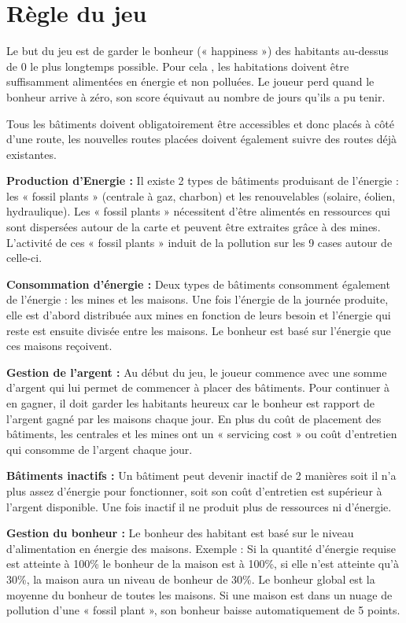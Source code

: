 \newpage
\section{Règle du jeu}

Le but du jeu est de garder le bonheur (« happiness ») des habitants au-dessus de 0 le plus longtemps possible. Pour cela , les habitations doivent être suffisamment alimentées en énergie et non polluées. Le joueur perd quand le bonheur arrive à zéro, son score équivaut au nombre de jours qu’ils a pu tenir.

Tous les bâtiments doivent obligatoirement être accessibles et donc placés à côté d’une route, les nouvelles routes placées doivent également suivre des routes déjà existantes.

\textbf{Production d’Energie :} 
	Il existe 2 types de bâtiments produisant de l’énergie : les « fossil plants » (centrale à gaz, charbon) et les renouvelables (solaire, éolien, hydraulique). Les « fossil plants » nécessitent d’être alimentés en ressources qui sont dispersées autour de la carte et peuvent être extraites grâce à des mines. L’activité de ces « fossil plants » induit de la pollution sur les 9 cases autour de celle-ci.
	
\textbf{Consommation d’énergie :}
	Deux types de bâtiments consomment également de l’énergie : les mines et les maisons. Une fois l’énergie de la journée produite, elle est d’abord distribuée aux mines en fonction de leurs besoin et l’énergie qui reste est ensuite divisée entre les maisons. Le bonheur est basé sur l’énergie que ces maisons reçoivent.
	
\textbf{Gestion de l’argent :}
	Au début du jeu, le joueur commence avec une somme d’argent qui lui permet de commencer à placer des bâtiments. Pour continuer à en gagner, il doit garder les habitants heureux car le bonheur est rapport de l’argent gagné par les maisons chaque jour. En plus du coût de placement des bâtiments, les centrales et les mines ont un « servicing cost » ou coût d’entretien qui consomme de l’argent chaque jour.
	
\textbf{Bâtiments inactifs :}
	Un bâtiment peut devenir inactif de 2 manières soit il n’a plus assez d’énergie pour fonctionner, soit son coût d’entretien est supérieur à l’argent disponible. Une fois inactif il ne produit plus de ressources ni d’énergie.
	
\textbf{Gestion du bonheur :}
	Le bonheur des habitant est basé sur le niveau d’alimentation en énergie des maisons. Exemple : Si la quantité d’énergie requise est atteinte à 100\% le bonheur de la maison est à 100\%, si elle n’est atteinte qu’à 30\%, la maison aura un niveau de bonheur de 30\%. Le bonheur global est la moyenne du bonheur de toutes les maisons. Si une maison est dans un nuage de pollution d’une « fossil plant », son bonheur baisse automatiquement de 5 points.
